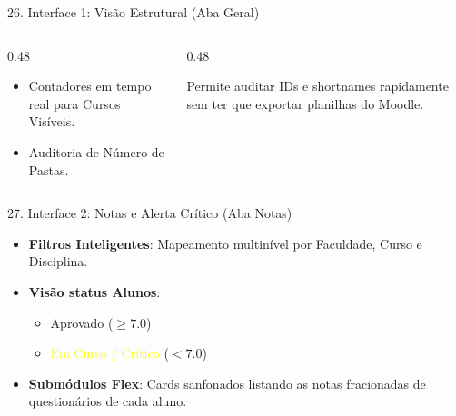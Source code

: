 \documentclass[10pt, aspectratio=169]{beamer}
\begin{document}
\begin{frame}{26. Interface 1: Visão Estrutural (Aba Geral)}
    \begin{columns}[onlytextwidth]
        \begin{column}{0.48\textwidth}
            \begin{tcolorbox}[enhanced,title=Métricas Pivot,colback=black!30,colframe=ArkosGreen,fonttitle=\bfseries]
                \begin{itemize}
                    \item Contadores em tempo real para Cursos Visíveis.
                    \item Auditoria de Número de Pastas.
                \end{itemize}
            \end{tcolorbox}
        \end{column}
        \begin{column}{0.48\textwidth}
            \begin{tcolorbox}[enhanced,title=Grids Flat,colback=black!30,colframe=cyan,fonttitle=\bfseries]
                Permite auditar IDs e shortnames rapidamente sem ter que exportar planilhas do Moodle.
            \end{tcolorbox}
        \end{column}
    \end{columns}
\end{frame}

\begin{frame}{27. Interface 2: Notas e Alerta Crítico (Aba Notas)}
    \begin{itemize}
        \item \textbf{Filtros Inteligentes}: Mapeamento multinível por Faculdade, Curso e Disciplina.
        \item \textbf{Visão status Alunos}:
            \begin{itemize}
                \item \textcolor{ArkosGreen}{Aprovado} ($\ge 7.0$)
                \item \textcolor{yellow}{Em Curso / Crítico} ($< 7.0$)
            \end{itemize}
        \item \textbf{Submódulos Flex}: Cards sanfonados listando as notas fracionadas de questionários de cada aluno.
    \end{itemize}
\end{frame}
\end{document}
